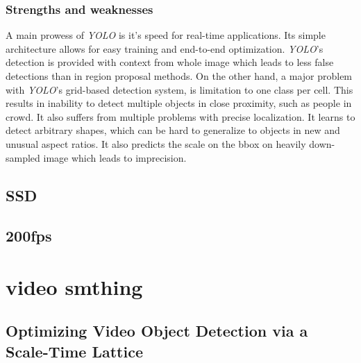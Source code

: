 \subsubsection{Strengths and weaknesses}
A main prowess of \textit{YOLO} is it's speed for real-time applications. Its simple architecture allows for easy training and end-to-end optimization. \textit{YOLO}'s detection is provided with context from whole image which leads to less false detections than in region proposal methods. On the other hand, a major problem with \textit{YOLO}'s grid-based detection system, is limitation to one class per cell. This results in inability to detect multiple objects in close proximity, such as people in crowd. It also suffers from multiple problems with precise localization. It learns to detect arbitrary shapes, which can be hard to generalize to objects in new and unusual aspect ratios. It also predicts the scale on the bbox on heavily down-sampled image which leads to imprecision. 

\subsection{SSD}
\citeauthor{bib:ssd} \cite{bib:ssd}

\subsection{200fps}

\section{video smthing}
\subsection{Optimizing Video Object Detection via a Scale-Time Lattice}
